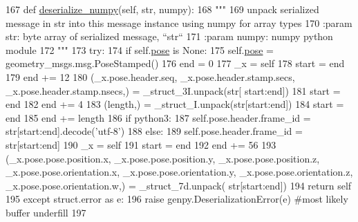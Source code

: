 \begin{DoxyCode}
167   \textcolor{keyword}{def }\hyperlink{classjaco__msgs_1_1msg_1_1__ArmPoseFeedback_1_1ArmPoseFeedback_a3bc6d31305a9ee2cd815b2a3ab511740}{deserialize\_numpy}(self, str, numpy):
168     \textcolor{stringliteral}{"""}
169 \textcolor{stringliteral}{    unpack serialized message in str into this message instance using numpy for array types}
170 \textcolor{stringliteral}{    :param str: byte array of serialized message, ``str``}
171 \textcolor{stringliteral}{    :param numpy: numpy python module}
172 \textcolor{stringliteral}{    """}
173     \textcolor{keywordflow}{try}:
174       \textcolor{keywordflow}{if} self.\hyperlink{classjaco__msgs_1_1msg_1_1__ArmPoseFeedback_1_1ArmPoseFeedback_a9d4fd79ad0f686d06e0aec8f2b046b37}{pose} \textcolor{keywordflow}{is} \textcolor{keywordtype}{None}:
175         self.\hyperlink{classjaco__msgs_1_1msg_1_1__ArmPoseFeedback_1_1ArmPoseFeedback_a9d4fd79ad0f686d06e0aec8f2b046b37}{pose} = geometry\_msgs.msg.PoseStamped()
176       end = 0
177       \_x = self
178       start = end
179       end += 12
180       (\_x.pose.header.seq, \_x.pose.header.stamp.secs, \_x.pose.header.stamp.nsecs,) = \_struct\_3I.unpack(str[
      start:end])
181       start = end
182       end += 4
183       (length,) = \_struct\_I.unpack(str[start:end])
184       start = end
185       end += length
186       \textcolor{keywordflow}{if} python3:
187         self.pose.header.frame\_id = str[start:end].decode(\textcolor{stringliteral}{'utf-8'})
188       \textcolor{keywordflow}{else}:
189         self.pose.header.frame\_id = str[start:end]
190       \_x = self
191       start = end
192       end += 56
193       (\_x.pose.pose.position.x, \_x.pose.pose.position.y, \_x.pose.pose.position.z, 
      \_x.pose.pose.orientation.x, \_x.pose.pose.orientation.y, \_x.pose.pose.orientation.z, \_x.pose.pose.orientation.w,) = \_struct\_7d.unpack(
      str[start:end])
194       \textcolor{keywordflow}{return} self
195     \textcolor{keywordflow}{except} struct.error \textcolor{keyword}{as} e:
196       \textcolor{keywordflow}{raise} genpy.DeserializationError(e) \textcolor{comment}{#most likely buffer underfill}
197 
\end{DoxyCode}
